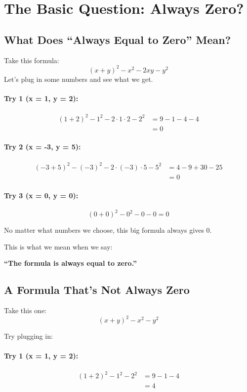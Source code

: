 \section{The Basic Question: Always Zero?}


\subsection*{What Does ``Always Equal to Zero'' Mean?}

Take this formula:
\[
(x + y)^2 - x^2 - 2xy - y^2
\]
Let’s plug in some numbers and see what we get.

\paragraph{Try 1 (x = 1, y = 2):}
\begin{align*}
(1 + 2)^2 - 1^2 - 2 \cdot 1 \cdot 2 - 2^2 &= 9 - 1 - 4 - 4 \\
&= 0
\end{align*}

\paragraph{Try 2 (x = -3, y = 5):}
\begin{align*}
(-3 + 5)^2 - (-3)^2 - 2 \cdot (-3) \cdot 5 - 5^2 &= 4 - 9 + 30 - 25 \\
&= 0
\end{align*}

\paragraph{Try 3 (x = 0, y = 0):}
\[
(0 + 0)^2 - 0^2 - 0 - 0 = 0
\]

No matter what numbers we choose, this big formula always gives $0$.

\medskip
This is what we mean when we say:

\textbf{``The formula is always equal to zero.''}

\subsection*{A Formula That’s Not Always Zero}

Take this one:
\[
(x + y)^2 - x^2 - y^2
\]

Try plugging in:

\paragraph{Try 1 (x = 1, y = 2):}
\begin{align*}
(1 + 2)^2 - 1^2 - 2^2 &= 9 - 1 - 4 \\
&= 4
\end{align*}

